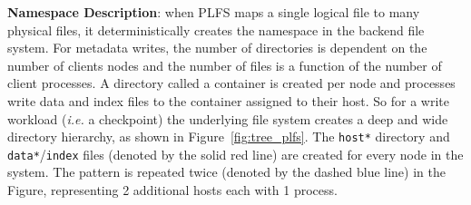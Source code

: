 



\textbf{Namespace Description}: when PLFS maps a single logical file to many
physical files, it deterministically creates the namespace in the backend file
system.  For metadata writes, the number of directories is dependent on the
number of clients nodes and the number of files is a function of the number of
client processes.  A directory called a container is created per node and
processes write data and index files to the container assigned to their host.
So for a write workload ({\it i.e.} a checkpoint) the underlying file system
creates a deep and wide directory hierarchy, as shown in
Figure~\ref{fig:tree_plfs}.  The \texttt{host*} directory and
\texttt{data*}/\texttt{index} files (denoted by the solid red line) are created
for every node in the system. The pattern is repeated twice (denoted by the
dashed blue line) in the Figure, representing 2 additional hosts each with 1
process.


